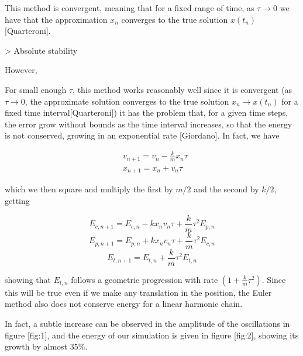 
This method is convergent, meaning that for a fixed range of time, as $\tau\to 0$ we have that the approximation $x_n$ converges to the true solution $x(t_n)$ [Quarteroni]. 


> Absolute stability



However, 

For small enough $\tau$, this method works reasonably well since it is convergent (as $\tau\to 0$, the approximate solution converges to the true solution $x_n\to x(t_n)$ for a fixed time interval[Quarteroni]) it has the problem that, for a given time steps, the error grow without bounds as the time interval increases, so that the energy is not conserved, growing in an exponential rate [Giordano]. In fact, we have

\begin{equation*}
\begin{aligned}
&v_{n+1} = v_n -\frac{k}{m}x_n \tau\\
&x_{n+1} = x_n + v_n \tau
\end{aligned}
\end{equation*}

which we then square and multiply the first by $m/2$ and the second by $k/2$, getting

$$E_{c,n+1} = E_{c,n} -k x_n v_n \tau + \frac{k}{m} \tau^2 E_{p,n}$$
$$E_{p,n+1} = E_{p,n} + k x_n v_n \tau + \frac{k}{m} \tau^2 E_{c,n}$$
$$E_{t,n+1} = E_{t,n} + \frac{k}{m} \tau^2 E_{t,n}$$

showing that $E_{t,n}$ follows a geometric progression with rate $(1+\frac{k}{m}\tau^2)$. Since this will be true even if we make any translation in the position, the Euler method also does not conserve energy for a linear harmonic chain. 

In fact, a subtle increase can be observed in the amplitude of the oscillations in figure [fig:1], and the energy of our simulation is given in figure [fig:2], showing its growth by almost $35\%$.

